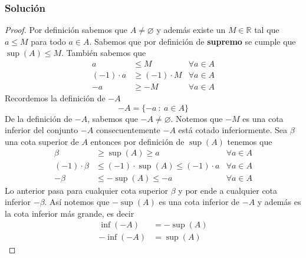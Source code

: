 \documentclass[a4paper]{article}
\begin{document}
\subsubsection*{Solución}
\begin{proof}
    Por definición sabemos que \(A \neq \varnothing\) y además existe un \(M \in \mathbb{R}\)
    tal que \(a \leq M\) para todo \(a \in A\). Sabemos que por definición de \textbf{supremo}
    se cumple que \(\sup{\left(A\right)} \leq M\). 
    También sabemos que
    \begin{align*}
        a &\leq M &\forall a \in A \\
        (-1) \cdot a &\geq (-1) \cdot M &\forall a \in A \\
        -a &\geq -M &\forall a \in A
    \end{align*}
    Recordemos la definición de \(-A\)
    \[
        -A = \{-a \ : \ a \in A\}
    \]
    De la definición de \(-A\), sabemos que \(-A \neq \varnothing\).
    Notemos que \(-M\) es una cota inferior del conjunto \(-A\)
    consecuentemente \(-A\) está cotado inferiormente. Sea \(\beta\) una cota 
    superior de \(A\) entonces por definición de \(\sup{\left(A\right)}\) tenemos que
    \begin{align*}
        \beta &\geq \sup{\left(A\right)} \geq a & \forall a \in A \\
        (-1) \cdot \beta &\leq (-1) \cdot \sup{\left(A\right)} \leq (-1) \cdot a & \forall a \in A \\
        -\beta &\leq -\sup{\left(A\right)} \leq -a & \forall a \in A
    \end{align*}
    Lo anterior pasa para cualquier cota superior \(\beta\) y por ende a cualquier cota inferior \(-\beta\).
    \newline
    Así notemos que \(-\sup{\left(A\right)}\) es una cota inferior de \(-A\) y además es la cota inferior 
    más grande, es decir
    \begin{align*}
        \inf{\left(-A\right)} &= -\sup{\left(A\right)} \\
        -\inf{\left(-A\right)} &= \sup{\left(A\right)}
    \end{align*}
\end{proof}
\end{document}
